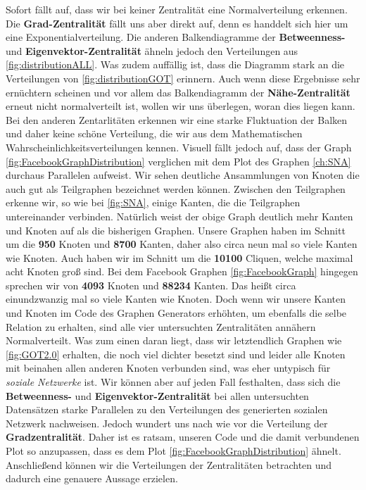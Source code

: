 Sofort fällt auf, dass wir bei keiner Zentralität eine Normalverteilung erkennen. Die \textbf{Grad-Zentralität} fällt uns aber direkt auf, denn es handdelt sich hier um eine Exponentialverteilung. Die anderen Balkendiagramme der \textbf{Betweenness-} und \textbf{Eigenvektor-Zentralität} ähneln jedoch den Verteilungen aus \ref{fig:distributionALL}. Was zudem auffällig ist, dass die Diagramm stark an die Verteilungen von \ref{fig:distributionGOT} erinnern. Auch wenn diese Ergebnisse sehr ernüchtern scheinen und vor allem das Balkendiagramm der \textbf{Nähe-Zentralität} erneut nicht normalverteilt ist, wollen wir uns überlegen, woran dies liegen kann. Bei den anderen Zentarlitäten erkennen wir eine starke Fluktuation der Balken und daher keine schöne Verteilung, die wir aus dem Mathematischen Wahrscheinlichkeitsverteilungen kennen. Visuell fällt jedoch auf, dass der Graph \ref{fig:FacebookGraphDistribution} verglichen mit dem Plot des Graphen \ref{ch:SNA} durchaus Parallelen aufweist. Wir sehen deutliche Ansammlungen von Knoten die auch gut als Teilgraphen bezeichnet werden können. Zwischen den Teilgraphen erkenne wir, so wie bei \ref{fig:SNA}, einige Kanten, die die Teilgraphen untereinander verbinden. Natürlich weist der obige Graph deutlich mehr Kanten und Knoten auf als die bisherigen Graphen. Unsere Graphen haben im Schnitt um die \textbf{950} Knoten und \textbf{8700} Kanten, daher also circa neun mal so viele Kanten wie Knoten. Auch haben wir im Schnitt um die \textbf{10100} Cliquen, welche maximal acht Knoten groß sind. Bei dem Facebook Graphen \ref{fig:FacebookGraph} hingegen sprechen wir von \textbf{4093} Knoten und \textbf{88234} Kanten. Das heißt circa einundzwanzig mal so viele Kanten wie Knoten. Doch wenn wir unsere Kanten und Knoten im Code des Graphen Generators erhöhten, um ebenfalls die selbe Relation zu erhalten, sind alle vier untersuchten Zentralitäten annähern Normalverteilt. Was zum einen daran liegt, dass wir letztendlich Graphen wie \ref{fig:GOT2.0} erhalten, die noch viel dichter besetzt sind und leider alle Knoten mit beinahen allen anderen Knoten verbunden sind, was eher untypisch für \textit{soziale Netzwerke} ist. Wir können aber auf jeden Fall festhalten, dass sich die \textbf{Betweenness-} und \textbf{Eigenvektor-Zentralität} bei allen untersuchten Datensätzen starke Parallelen zu den Verteilungen des generierten sozialen Netzwerk nachweisen. Jedoch wundert uns nach wie vor die Verteilung der \textbf{Gradzentralität}. Daher ist es ratsam, unseren Code und die damit verbundenen Plot so anzupassen, dass es dem Plot \ref{fig:FacebookGraphDistribution} ähnelt. Anschließend können wir die Verteilungen der Zentralitäten betrachten und dadurch eine genauere Aussage erzielen. 


